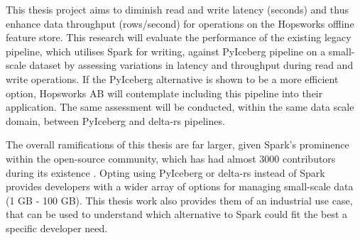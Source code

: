 This thesis project aims to diminish read and write latency (seconds) and thus enhance data throughput (rows/second) for operations on the Hopsworks offline feature store. This research will evaluate the performance of the existing legacy pipeline, which utilises Spark for writing, against PyIceberg pipeline on a small-scale dataset by assessing variations in latency and throughput during read and write operations. If the PyIceberg alternative is shown to be a more efficient option, Hopsworks \gls{AB} will contemplate including this pipeline into their application. The same assessment will be conducted, within the same data scale domain, between PyIceberg and delta-rs pipelines.

The overall ramifications of this thesis are far larger, given Spark's prominence within the open-source community, which has had almost 3000 contributors during its existence \cite{ApacheSparkOpen}. Opting using PyIceberg or delta-rs instead of Spark provides developers with a wider array of options for managing small-scale data (1 GB - 100 GB). This thesis work also provides them of an industrial use case, that can be used to understand which alternative to Spark could fit the best a specific developer need.